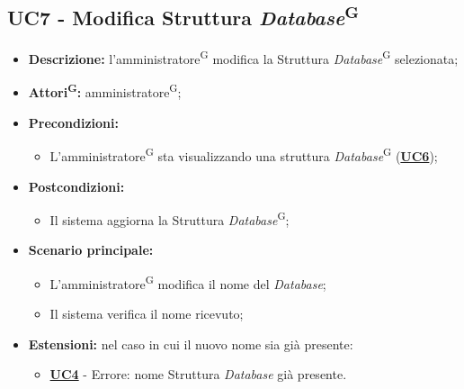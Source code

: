 \subsection{UC7 - Modifica Struttura \textit{Database}\textsuperscript{G}}
\label{sec:UC7}
\begin{itemize}
	\item \textbf{Descrizione:} l’amministratore\textsuperscript{G} modifica la Struttura \textit{Database}\textsuperscript{G} selezionata;
	\item \textbf{Attori\textsuperscript{G}:} amministratore\textsuperscript{G};
	\item \textbf{Precondizioni:} 
	\begin{itemize}
		\item L’amministratore\textsuperscript{G} sta visualizzando una struttura \textit{Database}\textsuperscript{G} (\hyperref[sec:UC6]{\textbf{UC6}});
	\end{itemize}
	\item \textbf{Postcondizioni:} 
	\begin{itemize}
		\item Il sistema aggiorna la Struttura \textit{Database}\textsuperscript{G};
	\end{itemize}
	\item \textbf{Scenario principale:} 
	\begin{itemize}
		\item L’amministratore\textsuperscript{G} modifica il nome del \textit{Database};
		\item Il sistema verifica il nome ricevuto;
	\end{itemize}
	\item \textbf{Estensioni:} nel caso in cui il nuovo nome sia già presente:
	\begin{itemize}
		\item \hyperref[sec:UC4]{\textbf{UC4}} - Errore: nome Struttura \textit{Database} già presente.
	\end{itemize}
\end{itemize}

